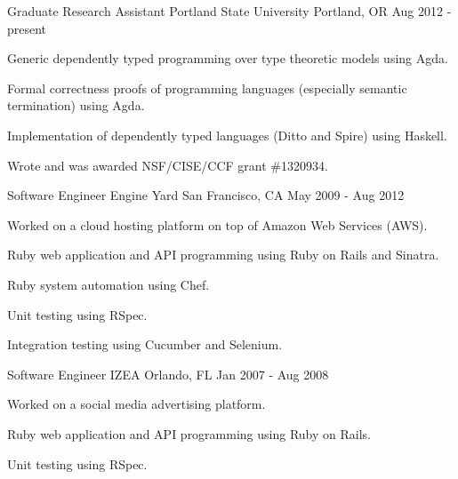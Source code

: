 

\begin{cventries}

  \cventry
    {Graduate Research Assistant} %
    {Portland State University} %
    {Portland, OR} %
    {Aug 2012 - present} %
    {
      \begin{cvitems} %
        \item {Generic dependently typed programming over type theoretic models using Agda.}
        \item {Formal correctness proofs of programming languages (especially semantic termination) using Agda.}
        \item {Implementation of dependently typed languages (Ditto and Spire) using Haskell.}
        \item {Wrote and was awarded NSF/CISE/CCF grant \#1320934.}
      \end{cvitems}
    }

  \cventry
    {Software Engineer} %
    {Engine Yard} %
    {San Francisco, CA} %
    {May 2009 - Aug 2012} %
    {
      \begin{cvitems} %
        \item {Worked on a cloud hosting platform on top of Amazon Web Services (AWS).}
        \item {Ruby web application and API programming using Ruby on Rails and Sinatra.}
        \item {Ruby system automation using Chef.}
        \item {Unit testing using RSpec.}
        \item {Integration testing using Cucumber and Selenium.}
      \end{cvitems}
    }

  \cventry
    {Software Engineer} %
    {IZEA} %
    {Orlando, FL} %
    {Jan 2007 - Aug 2008} %
    {
      \begin{cvitems} %
        \item {Worked on a social media advertising platform.}
        \item {Ruby web application and API programming using Ruby on Rails.}
        \item {Unit testing using RSpec.}
      \end{cvitems}
    }


\end{cventries}

